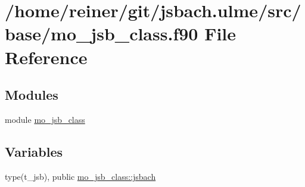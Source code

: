 \hypertarget{mo__jsb__class_8f90}{}\section{/home/reiner/git/jsbach.ulme/src/base/mo\+\_\+jsb\+\_\+class.f90 File Reference}
\label{mo__jsb__class_8f90}
\subsection*{Modules}
\begin{DoxyCompactItemize}
\item 
module \hyperlink{namespacemo__jsb__class}{mo\+\_\+jsb\+\_\+class}
\end{DoxyCompactItemize}
\subsection*{Variables}
\begin{DoxyCompactItemize}
\item 
type(t\+\_\+jsb), public \hyperlink{namespacemo__jsb__class_a05ebd478dbddfcc8bb94cba5047c65b7}{mo\+\_\+jsb\+\_\+class\+::jsbach}
\end{DoxyCompactItemize}
